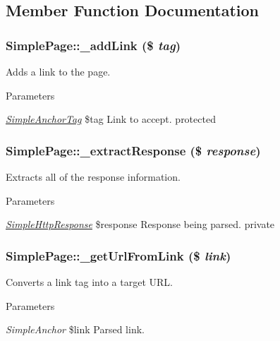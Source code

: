 \subsection{Member Function Documentation}
\hypertarget{class_simple_page_a2897dc5949099b7051c3b16b3bd83f63}{
\subsubsection[{\_\-addLink}]{\setlength{\rightskip}{0pt plus 5cm}SimplePage::\_\-addLink (\$ {\em tag})}}
\label{class_simple_page_a2897dc5949099b7051c3b16b3bd83f63}
Adds a link to the page. 
\begin{DoxyParams}{Parameters}
\item[{\em \hyperlink{class_simple_anchor_tag}{SimpleAnchorTag}}]\$tag Link to accept.  protected \end{DoxyParams}
\hypertarget{class_simple_page_acd294e7035f27eb2c333d22abc2a9f10}{
\subsubsection[{\_\-extractResponse}]{\setlength{\rightskip}{0pt plus 5cm}SimplePage::\_\-extractResponse (\$ {\em response})}}
\label{class_simple_page_acd294e7035f27eb2c333d22abc2a9f10}
Extracts all of the response information. 
\begin{DoxyParams}{Parameters}
\item[{\em \hyperlink{class_simple_http_response}{SimpleHttpResponse}}]\$response Response being parsed.  private \end{DoxyParams}
\hypertarget{class_simple_page_a99994deae1c78806260a9c6b4efe638d}{
\subsubsection[{\_\-getUrlFromLink}]{\setlength{\rightskip}{0pt plus 5cm}SimplePage::\_\-getUrlFromLink (\$ {\em link})}}
\label{class_simple_page_a99994deae1c78806260a9c6b4efe638d}
Converts a link tag into a target URL. 
\begin{DoxyParams}{Parameters}
\item[{\em SimpleAnchor}]\$link Parsed link. \end{DoxyParams}
